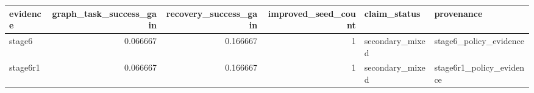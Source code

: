 \begin{tabular}{lrrrll}
\toprule
evidence & graph\_task\_success\_gain & recovery\_success\_gain & improved\_seed\_count & claim\_status & provenance \\
\midrule
stage6 & 0.066667 & 0.166667 & 1 & secondary\_mixed & stage6\_policy\_evidence \\
stage6r1 & 0.066667 & 0.166667 & 1 & secondary\_mixed & stage6r1\_policy\_evidence \\
\bottomrule
\end{tabular}

